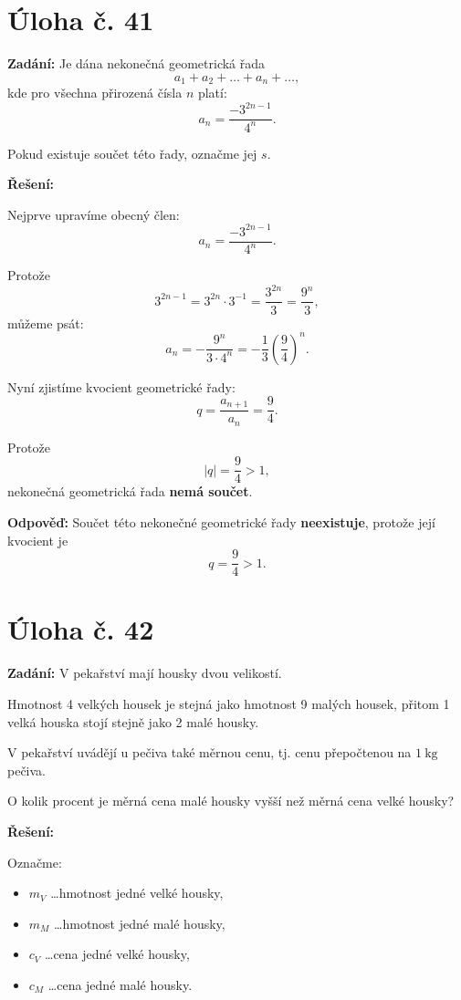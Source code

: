 \documentclass[12pt,a4paper]{article}
\begin{document}
\section*{Úloha č. 41}

\textbf{Zadání:}  
Je dána nekonečná geometrická řada
\[
a_1+a_2+\dots+a_n+\dots,
\]
kde pro všechna přirozená čísla \(n\) platí:
\[
a_n=\frac{-3^{2n-1}}{4^n}.
\]

Pokud existuje součet této řady, označme jej \(s\).

\bigskip

\textbf{Řešení:}

Nejprve upravíme obecný člen:
\[
a_n=\frac{-3^{2n-1}}{4^n}.
\]

Protože
\[
3^{2n-1}=3^{2n}\cdot 3^{-1}=\frac{3^{2n}}{3}=\frac{9^n}{3},
\]
můžeme psát:
\[
a_n=-\frac{9^n}{3\cdot 4^n}
=-\frac{1}{3}\left(\frac94\right)^n.
\]

\medskip

Nyní zjistíme kvocient geometrické řady:
\[
q=\frac{a_{n+1}}{a_n}=\frac94.
\]

Protože
\[
\left|q\right|=\frac94>1,
\]
nekonečná geometrická řada \textbf{nemá součet}.

\bigskip

\textbf{Odpověď:}  
Součet této nekonečné geometrické řady \textbf{neexistuje}, protože její kvocient je
\[
q=\frac94>1.
\]


\newpage
\section*{Úloha č. 42}

\textbf{Zadání:}  
V pekařství mají housky dvou velikostí.

Hmotnost 4 velkých housek je stejná jako hmotnost 9 malých housek, přitom 1 velká houska stojí stejně jako 2 malé housky.

V pekařství uvádějí u pečiva také měrnou cenu, tj. cenu přepočtenou na \(1\ \mathrm{kg}\) pečiva.

O kolik procent je měrná cena malé housky vyšší než měrná cena velké housky?

\bigskip

\textbf{Řešení:}

Označme:
\begin{itemize}
    \item \(m_V\) \dots hmotnost jedné velké housky,
    \item \(m_M\) \dots hmotnost jedné malé housky,
    \item \(c_V\) \dots cena jedné velké housky,
    \item \(c_M\) \dots cena jedné malé housky.
\end{itemize}
\end{document}
